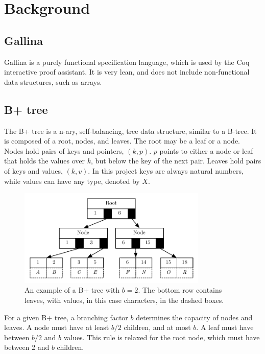 \section{Background}
\label{sec:Background}

\subsection{Gallina}
Gallina is a purely functional specification language, which is used by the Coq interactive proof assistant. It is very lean, and does not include non-functional data structures, such as arrays. 

\subsection{B+ tree}
The B+ tree is a n-ary, self-balancing, tree data structure, similar to a B-tree. It is composed of a root, nodes, and leaves. The root may be a leaf or a node. Nodes hold pairs of keys and pointers, $(k, p)$. $p$ points to either a node or leaf that holds the values over $k$, but below the key of the next pair. Leaves hold pairs of keys and values, $(k, v)$. In this project keys are always natural numbers, while values can have any type, denoted by $X$. 

\begin{figure}
 \centering
   \includegraphics[width=90mm]{diagrams/BPlusTree.pdf}
 \caption{An example of a B+ tree with $b=2$. The bottom row contains leaves, with values, in this case characters, in the dashed boxes.}
 \label{fig:bplustree}
\end{figure}

For a given B+ tree, a branching factor $b$ determines the capacity of nodes and
leaves. A node must have at least $b/2$ children, and at most $b$. A
leaf must have between $b/2$ and $b$ values. This rule is relaxed for the root
node, which must have between 2 and $b$ children. 
